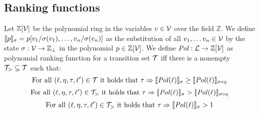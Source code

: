 \subsection{Ranking functions}

\begin{definition} 
	Let $\mathbb{Z}[\mathcal{V}]$ be the polynomial ring in the variables $v \in \mathcal{V}$ over the field $\mathbb{Z}$.
	We define $\llbracket p \rrbracket_{\sigma} = p[v_1/\sigma(v_1), \dots, v_n/\sigma(v_n)]$ as the substitution of all $v_1, \dots v_n \in \mathcal{V}$ by the state $\sigma: \mathcal{V} \rightarrow \mathbb{Z}_\bot$ in the polynomial $p \in \mathbb{Z}[\mathcal{V}]$.
	We define $\mathit{Pol}: \mathcal{L} \rightarrow \mathbb{Z}[\mathcal{V}]$ as polynomial ranking function for a transition set $\mathcal{T}$ iff there is a nonempty $\mathcal{T}_{>} \subseteq \mathcal{T}$ such that:
	\[ \text{For all } (\ell, \eta, \tau, \ell') \in \mathcal{T} \text{ it holds that } \tau \Rightarrow \llbracket \mathit{Pol}(\ell) \rrbracket_{\sigma} \geq \llbracket \mathit{Pol}(\ell) \rrbracket_{\sigma \circ \eta} \]
	\[ \text{For all } (\ell, \eta, \tau, \ell') \in \mathcal{T}_{>} \text{ it holds that } \tau \Rightarrow \llbracket \mathit{Pol}(\ell) \rrbracket_{\sigma} > \llbracket \mathit{Pol}(\ell) \rrbracket_{\sigma \circ \eta} \]
	\[ \text{For all } (\ell, \eta, \tau, \ell') \in \mathcal{T}_{>} \text{ it holds that } \tau \Rightarrow \llbracket \mathit{Pol}(\ell) \rrbracket_{\sigma} > 1 \]
\end{definition}
